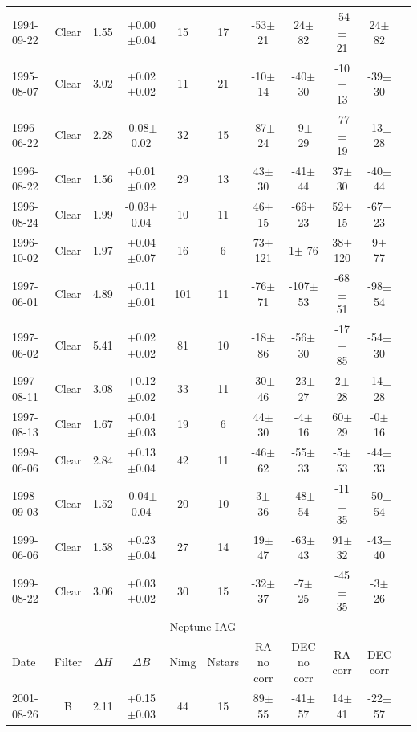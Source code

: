 \documentclass[12pt,a4paper]{report}
\begin{document}
\begin{landscape}
\begin{longtable}{|l|c|c|c|c|c|c|c|c|c|c|}
1994-09-22 & Clear & 1.55 & +0.00$\pm$0.04 &  15 &  17 &  -53$\pm$ 21 &   24$\pm$ 82 &  -54$\pm$ 21 &   24$\pm$ 82 \\ 
1995-08-07 & Clear & 3.02 & +0.02$\pm$0.02 &  11 &  21 &  -10$\pm$ 14 &  -40$\pm$ 30 &  -10$\pm$ 13 &  -39$\pm$ 30 \\ 
1996-06-22 & Clear & 2.28 & -0.08$\pm$0.02 &  32 &  15 &  -87$\pm$ 24 &   -9$\pm$ 29 &  -77$\pm$ 19 &  -13$\pm$ 28 \\ 
1996-08-22 & Clear & 1.56 & +0.01$\pm$0.02 &  29 &  13 &   43$\pm$ 30 &  -41$\pm$ 44 &   37$\pm$ 30 &  -40$\pm$ 44 \\ 
1996-08-24 & Clear & 1.99 & -0.03$\pm$0.04 &  10 &  11 &   46$\pm$ 15 &  -66$\pm$ 23 &   52$\pm$ 15 &  -67$\pm$ 23 \\ 
1996-10-02 & Clear & 1.97 & +0.04$\pm$0.07 &  16 &   6 &   73$\pm$121 &    1$\pm$ 76 &   38$\pm$120 &    9$\pm$ 77 \\ 
1997-06-01 & Clear & 4.89 & +0.11$\pm$0.01 & 101 &  11 &  -76$\pm$ 71 & -107$\pm$ 53 &  -68$\pm$ 51 &  -98$\pm$ 54 \\ 
1997-06-02 & Clear & 5.41 & +0.02$\pm$0.02 &  81 &  10 &  -18$\pm$ 86 &  -56$\pm$ 30 &  -17$\pm$ 85 &  -54$\pm$ 30 \\ 
1997-08-11 & Clear & 3.08 & +0.12$\pm$0.02 &  33 &  11 &  -30$\pm$ 46 &  -23$\pm$ 27 &    2$\pm$ 28 &  -14$\pm$ 28 \\ 
1997-08-13 & Clear & 1.67 & +0.04$\pm$0.03 &  19 &   6 &   44$\pm$ 30 &   -4$\pm$ 16 &   60$\pm$ 29 &   -0$\pm$ 16 \\ 
1998-06-06 & Clear & 2.84 & +0.13$\pm$0.04 &  42 &  11 &  -46$\pm$ 62 &  -55$\pm$ 33 &   -5$\pm$ 53 &  -44$\pm$ 33 \\ 
1998-09-03 & Clear & 1.52 & -0.04$\pm$0.04 &  20 &  10 &    3$\pm$ 36 &  -48$\pm$ 54 &  -11$\pm$ 35 &  -50$\pm$ 54 \\ 
1999-06-06 & Clear & 1.58 & +0.23$\pm$0.04 &  27 &  14 &   19$\pm$ 47 &  -63$\pm$ 43 &   91$\pm$ 32 &  -43$\pm$ 40 \\ 
1999-08-22 & Clear & 3.06 & +0.03$\pm$0.02 &  30 &  15 &  -32$\pm$ 37 &   -7$\pm$ 25 &  -45$\pm$ 35 &   -3$\pm$ 26 \\ 
\hline
\multicolumn{10}{|c|}{Neptune-IAG}\\
Date & Filter & $\Delta H$ & $\Delta B$ & Nimg & Nstars & RA no corr & DEC no corr & RA corr & DEC corr \\
\hline
2001-08-26 & B     & 2.11 & +0.15$\pm$0.03 &  44 &  15 &   89$\pm$ 55 &  -41$\pm$ 57 &   14$\pm$ 41 &  -22$\pm$ 57 \\ 

\end{longtable}
\end{landscape}
\end{document}
